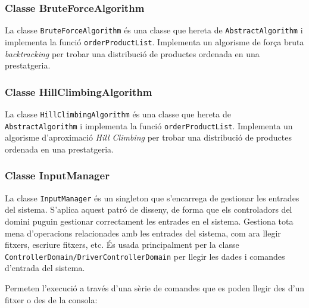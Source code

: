\documentclass[a4paper, t]{article}
\begin{document}
\subsubsection{Classe BruteForceAlgorithm}
La classe \texttt{BruteForceAlgorithm} és una classe que hereta de \texttt{AbstractAlgorithm} i implementa la funció \texttt{orderProductList}.
Implementa un algorisme de força bruta \textit{backtracking} per trobar una distribució de productes ordenada en una prestatgeria.

\subsubsection{Classe HillClimbingAlgorithm}
La classe \texttt{HillClimbingAlgorithm} és una classe que hereta de \texttt{AbstractAlgorithm} i implementa la funció \texttt{orderProductList}.
Implementa un algorisme d’aproximació \textit{Hill Climbing} per trobar una distribució de productes ordenada en una prestatgeria.

\newpage
\subsubsection{Classe InputManager}
La classe \texttt{InputManager} és un singleton que s’encarrega de gestionar les entrades del sistema. 
S’aplica aquest patró de disseny, de forma que els controladors del domini puguin gestionar correctament les entrades en el sistema. 
Gestiona tota mena d’operacions relacionades amb les entrades del sistema, com ara llegir fitxers, escriure fitxers, etc. 
És usada principalment per la classe \texttt{ControllerDomain/DriverControllerDomain} per llegir les dades i comandes d’entrada del sistema.

Permeten l’execució a través d’una sèrie de comandes que es poden llegir des d’un fitxer o des de la consola:
\end{document}
